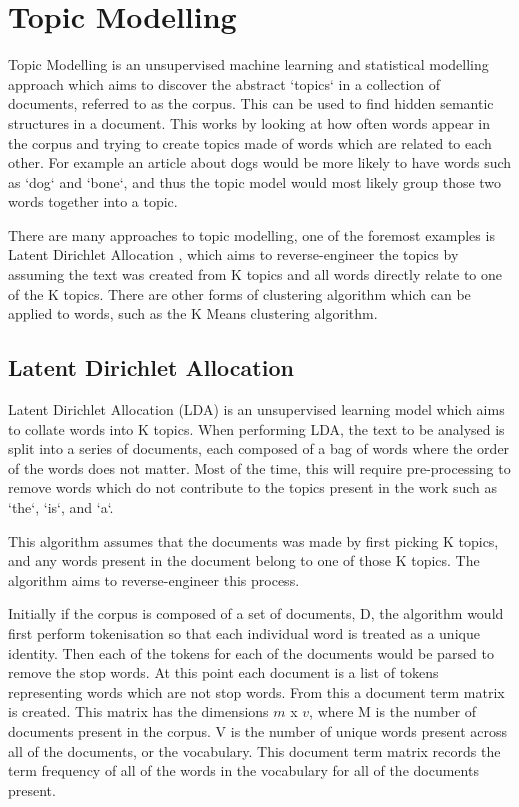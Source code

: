 \section{Topic Modelling}
\label{topic}
Topic Modelling is an unsupervised machine learning and statistical modelling approach which aims to discover the abstract `topics` in a collection of documents, referred to as the corpus. This can be used to find hidden semantic structures in a document. This works by looking at how often words appear in the corpus and trying to create topics made of words which are related to each other. For example an article about dogs would be more likely to have words such as `dog` and `bone`, and thus the topic model would most likely group those two words together into a topic. 

There are many approaches to topic modelling, one of the foremost examples is Latent Dirichlet Allocation \cite{blei2003latent}, which aims to reverse-engineer the topics by assuming the text was created from K topics and all words directly relate to one of the K topics. There are other forms of clustering algorithm which can be applied to words, such as the K Means clustering algorithm. 

\subsection{Latent Dirichlet Allocation}
Latent Dirichlet Allocation (LDA) is an unsupervised learning model which aims to collate words into K topics. When performing LDA, the text to be analysed is split into a series of documents, each composed of a bag of words where the order of the words does not matter. Most of the time, this will require pre-processing to remove words which do not contribute to the topics present in the work such as `the`, `is`,  and `a`. 

\noindent This algorithm assumes that the documents was made by first picking K topics, and any words present in the document belong to one of those K topics. The algorithm aims to reverse-engineer this process.

Initially if the corpus is composed of a set of documents, D, the algorithm would first perform tokenisation so that each individual word is treated as a unique identity. Then each of the tokens for each of the documents would be parsed to remove the stop words. At this point each document is a list of tokens representing words which are not stop words. From this a document term matrix is created. This matrix has the dimensions $m$ x $v$, where M is the number of documents present in the corpus. V is the number of unique words present across all of the documents, or the vocabulary. This document term matrix records the term frequency of all of the words in the vocabulary for all of the documents present.


